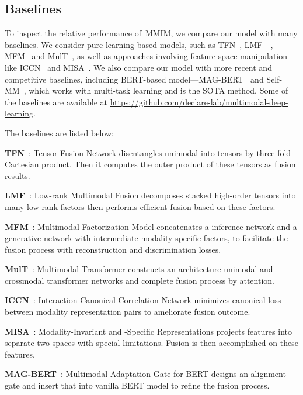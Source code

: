 \documentclass[11pt]{article}
\newcommand{\modelname}{MMIM}
\begin{document}
\subsection{Baselines}
To inspect the relative performance of~\modelname, we compare our model with many baselines. 
We consider pure learning based models, such as TFN~\citep{zadeh2017tensor}, LMF~~\citep{liu2018efficient}, MFM~\citep{tsai2019learning} and MulT~\citep{tsai2019multimodal}, as well as approaches involving feature space manipulation like ICCN~\citep{sun2020learning} and MISA~\citep{hazarika2020misa}.
We also compare our model with more recent and competitive baselines, including BERT-based model---MAG-BERT~\citep{rahman-etal-2020-integrating} and Self-MM~\citep{yu2021learning}, which works with multi-task learning and is the SOTA method. Some of the baselines are available at \url{https://github.com/declare-lab/multimodal-deep-learning}.

The baselines are listed below:

\textbf{TFN}~\citep{zadeh2017tensor}: 
Tensor Fusion Network disentangles unimodal into tensors by three-fold Cartesian product. 
Then it computes the outer product of these tensors as fusion results.

\textbf{LMF}~\citep{liu2018efficient}: Low-rank Multimodal Fusion decomposes stacked high-order tensors into many low rank factors then performs efficient fusion based on these factors.

\textbf{MFM}~\citep{tsai2019learning}: Multimodal Factorization Model concatenates a inference network and a generative network with intermediate modality-specific factors, to facilitate the fusion process with reconstruction and discrimination losses.

\textbf{MulT}~\citep{tsai2019multimodal}: Multimodal Transformer constructs an architecture  unimodal and crossmodal transformer networks and complete fusion process by attention.

\textbf{ICCN}~\citep{sun2020learning}: Interaction Canonical Correlation Network minimizes canonical loss between modality representation pairs to ameliorate fusion outcome.

\textbf{MISA}~\citep{hazarika2020misa}: Modality-Invariant and -Specific Representations projects features into separate two spaces with special limitations. Fusion is then accomplished on these features.



\textbf{MAG-BERT}~\citep{rahman-etal-2020-integrating}: Multimodal Adaptation Gate for BERT designs an alignment gate and insert that into vanilla BERT model to refine the fusion process.
\end{document}
